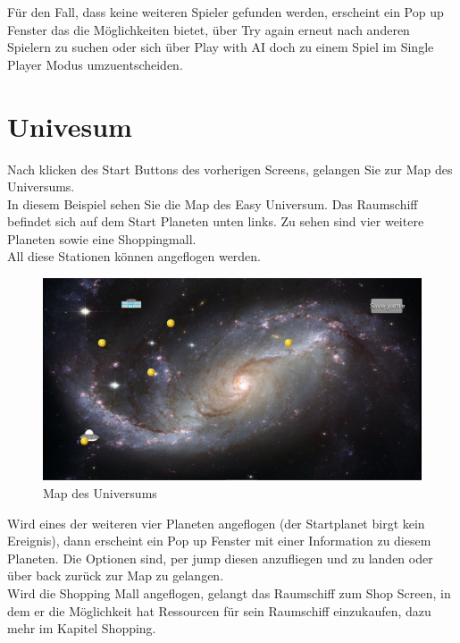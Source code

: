 \documentclass[fontsize=12pt,paper=a4,twoside]{scrartcl}
\begin{document}
Für den Fall, dass keine weiteren Spieler gefunden werden, erscheint ein Pop up Fenster das die Möglichkeiten bietet, über Try again erneut nach anderen Spielern zu suchen
oder sich über Play with AI doch zu einem Spiel im Single Player Modus umzuentscheiden.\\
 
\newpage
\section{Univesum}

Nach klicken des Start Buttons des vorherigen Screens, gelangen Sie zur Map des Universums.\\
In diesem Beispiel sehen Sie die Map des Easy Universum. Das Raumschiff befindet sich auf dem Start Planeten unten links. Zu sehen sind vier weitere Planeten sowie eine Shoppingmall.\\
All diese Stationen können angeflogen werden.
\begin{figure}[htp]
	\centering
	\includegraphics[width=1.00\linewidth]{pics/universeEasyP1.png}
	\caption{Map des Universums}
	\label{fig1}
\end{figure}

Wird eines der weiteren vier Planeten angeflogen (der Startplanet birgt kein Ereignis), dann erscheint ein
Pop up Fenster mit einer Information zu diesem Planeten. Die Optionen sind, per jump diesen anzufliegen und zu landen oder über back zurück zur Map zu gelangen.\\
Wird die Shopping Mall angeflogen, gelangt das Raumschiff zum Shop Screen, in dem er die Möglichkeit hat Ressourcen für sein Raumschiff einzukaufen, dazu mehr im Kapitel Shopping.\\
\end{document}
